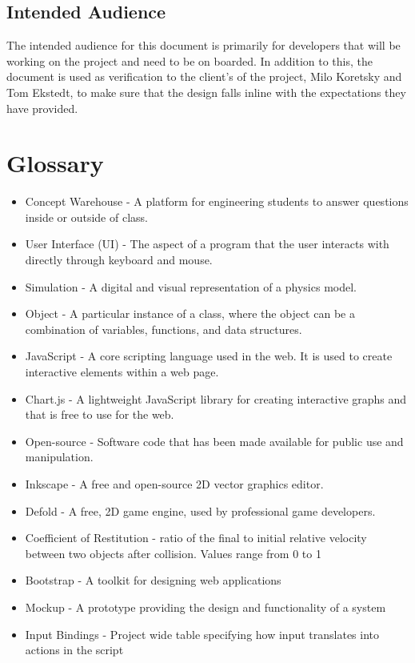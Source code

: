\documentclass[onecolumn, draftclsnofoot,10pt, compsoc]{IEEEtran}
\begin{document}
\subsection{Intended Audience}
The intended audience for this document is primarily for developers that will be working on the project and need to be on boarded. In addition to this, the document is used as verification to the client's of the project, Milo Koretsky and Tom Ekstedt, to make sure that the design falls inline with the expectations they have provided.


\section{Glossary}
\begin{itemize}
  \item Concept Warehouse - A platform for engineering students to answer questions inside or outside of class.
  \item User Interface (UI) - The aspect of a program that the user interacts with directly through keyboard and mouse.
  \item Simulation - A digital and visual representation of a physics model.
  \item Object - A particular instance of a class, where the object can be a combination of variables, functions, and data structures.
  \item JavaScript - A core scripting language used in the web. It is used to create interactive elements within a web page.
  \item Chart.js - A lightweight JavaScript library for creating interactive graphs and that is free to use for the web.
  \item Open-source - Software code that has been made available for public use and manipulation.
  \item Inkscape - A free and open-source 2D vector graphics editor.
  \item Defold - A free, 2D game engine, used by professional game developers.
  \item Coefficient of Restitution - ratio of the final to initial relative velocity between two objects after collision. Values range from 0 to 1
  \item Bootstrap - A toolkit for designing web applications
  \item Mockup - A prototype providing the design and functionality of a system 
  \item Input Bindings - Project wide table specifying how input translates into actions in the script
\end{itemize} 
\end{document}
